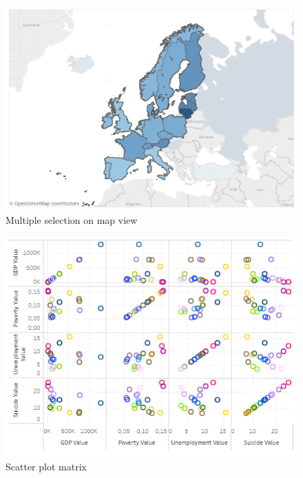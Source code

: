 \documentclass{vgtc}                          %
\begin{document}
\begin{itemize}
\begin{figure}[tb]
\centering
\includegraphics[width=\columnwidth]{image/chris/researcher04.png}
\caption{Multiple selection on map view}
\label{fig:resMapM} 
\end{figure}

\begin{figure}[tb]
\centering
\includegraphics[width=\columnwidth]{image/chris/researcher05.png}
\caption{Scatter plot matrix}
\label{fig:resScatter} 
\end{figure}


\end{itemize}
\end{document}
